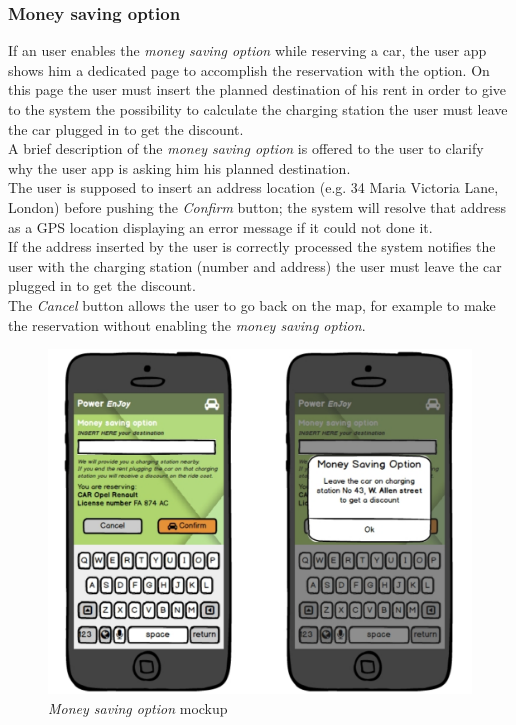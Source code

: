 \subsubsection{Money saving option}

If an user enables the \emph{money saving option} while reserving a car, the user app shows him a dedicated page to accomplish the reservation with the option. On this page the user must insert the planned destination of his rent in order to give to the system the possibility to calculate the charging station the user must leave the car plugged in to get the discount.\\

A brief description of the \emph{money saving option} is offered to the user to clarify why the user app is asking him his planned destination. \\

The user is supposed to insert an address location (e.g. 34 Maria Victoria Lane, London) before pushing the \emph{Confirm} button; the system will resolve that address as a GPS location displaying an error message if it could not done it. \\

If the address inserted by the user is correctly processed the system notifies the user with the charging station (number and address) 
the user must leave the car plugged in to get the discount. \\

The \emph{Cancel} button allows the user to go back on the map, for example to make the reservation without enabling the \emph{money saving option}.\\

\begin{figure}[h]
			\centering
			\includegraphics[width=0.9\linewidth]{mockups/moneySavingOption}
			\caption{
				\label{fig:msOption} 
				\emph{Money saving option} mockup
			}
		\end{figure}

